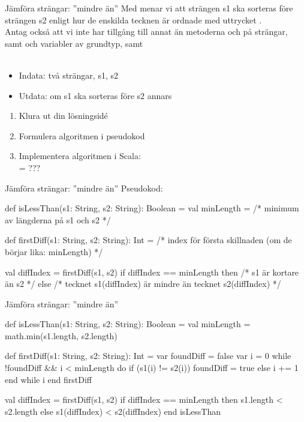 \begin{Slide}{Jämföra strängar: ''mindre än''}\SlideFontSmall
Med  menar vi att strängen s1 ska sorteras före strängen s2 enligt hur de enskilda tecknen är ordnade med uttrycket . \\
Antag också att vi inte har tillgång till annat än metoderna  och  på strängar, samt   och variabler av grundtyp, samt 
\\\\
\begin{itemize}
\item Indata: två strängar, s1, s2
\item Utdata:  om s1 ska sorteras före s2 annars 
\end{itemize}
\begin{enumerate}
\item Klura ut din lösningsidé
\item Formulera algoritmen i pseudokod
\item Implementera algoritmen i Scala: \\ = ???
\end{enumerate}
\end{Slide}

\begin{Slide}{Jämföra strängar: ''mindre än''}\SlideFontSmall
Pseudokod:
\begin{Code}
def isLessThan(s1: String, s2: String): Boolean = 
  val minLength = /* minimum av längderna på s1 och s2 */

  def firstDiff(s1: String, s2: String): Int =
    /* index för första skillnaden (om de börjar lika: minLength) */

  val diffIndex = firstDiff(s1, s2)
  if diffIndex == minLength then /* s1 är kortare än s2 */
  else /* tecknet s1(diffIndex) är mindre än tecknet s2(diffIndex) */
\end{Code}
\end{Slide}

\begin{Slide}{Jämföra strängar: ''mindre än''}\SlideFontSmall
\begin{Code}
def isLessThan(s1: String, s2: String): Boolean = 
  val minLength = math.min(s1.length, s2.length)

  def firstDiff(s1: String, s2: String): Int = 
    var foundDiff = false
    var i = 0
    while !foundDiff && i < minLength do
      if (s1(i) != s2(i)) foundDiff = true
      else i += 1
    end while
    i
  end firstDiff  

  val diffIndex = firstDiff(s1, s2)
  if diffIndex == minLength then s1.length < s2.length
  else s1(diffIndex) < s2(diffIndex)
end isLessThan
\end{Code}
\end{Slide}

